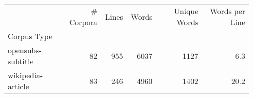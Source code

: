 \begin{tabular}{lrrrrr}
\toprule
 & \# Corpora & Lines & Words & Unique Words & Words per Line \\
Corpus Type &  &  &  &  &  \\
\midrule
opensubs-subtitle & 82 & 955 & 6037 & 1127 & 6.3 \\
wikipedia-article & 83 & 246 & 4960 & 1402 & 20.2 \\
\bottomrule
\end{tabular}
